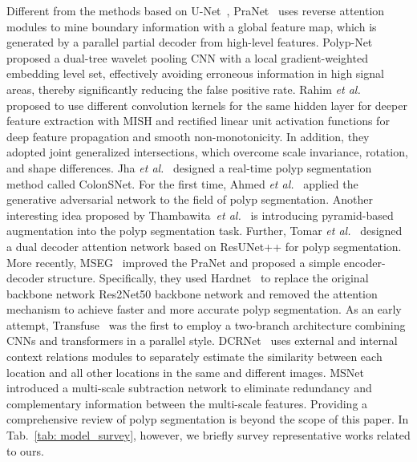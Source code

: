 \documentclass[journal]{IEEEtran}
\def\etal{\textit{et al.}}
\begin{document}
Different from the methods based on U-Net~\cite{ronneberger2015unet,zhou2018unet++,AlamTTJR20}, PraNet~\cite{fan2020pranet} uses reverse attention modules to mine boundary information with a global feature map, which is generated by a parallel partial decoder from high-level features.
Polyp-Net~\cite{banik2020polyp} proposed a dual-tree wavelet pooling CNN with a local gradient-weighted embedding level set, effectively avoiding erroneous information in high signal areas, thereby significantly reducing the false positive rate.
Rahim \etal~\cite{rahim2021deep} proposed to use different convolution kernels for the same hidden layer for deeper feature extraction with MISH and rectified linear unit activation functions for deep feature propagation and smooth non-monotonicity. In addition, they adopted joint generalized intersections, which overcome scale invariance, rotation, and shape differences.
Jha \etal~\cite{jha2021real} designed a real-time polyp segmentation method called ColonSNet.
For the first time, Ahmed \etal~\cite{ahmed2020generative} applied the generative adversarial network to the field of polyp segmentation.
Another interesting idea proposed by Thambawita~\etal~\cite{ThambawitaHHR20} is introducing pyramid-based augmentation into the polyp segmentation task.
Further, Tomar \etal~\cite{tomar2020ddanet} designed a dual decoder attention network based on ResUNet++ for polyp segmentation.
More recently, MSEG~\cite{huang2021hardnet} improved the PraNet and proposed a simple encoder-decoder structure. 
Specifically, they used Hardnet~\cite{chao2019hardnet} to replace the original backbone network Res2Net50 backbone network and removed the attention mechanism to achieve faster and more accurate polyp segmentation. 
As an early attempt, Transfuse~\cite{zhang2021transfuse} was the first to employ a two-branch architecture combining CNNs and transformers in a parallel style. 
DCRNet~\cite{yin2021duplex} uses external and internal context relations modules to separately estimate the similarity between each location and all other locations in the same and different images.
MSNet~\cite{Zhao_2021_MICCAI} introduced a multi-scale subtraction network to eliminate redundancy and complementary information between the multi-scale features.
Providing a comprehensive review of polyp segmentation is beyond the scope of this paper. 
In Tab.~\ref{tab: model_survey}, however, we briefly survey  representative works related to ours.
\end{document}
